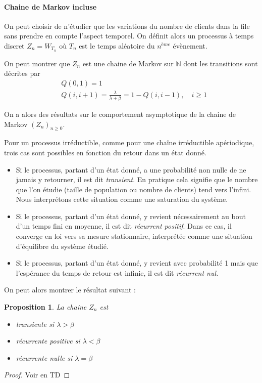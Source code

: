 \documentclass[a4paper,12pt]{book}
\newtheorem{propfr}[thmfr]{Proposition}
\newcommand{\N}{\mathbb{N}}
\begin{document}
\paragraph{Chaine de Markov incluse}
On peut choisir de n'étudier que les variations du nombre de clients dans la file sans prendre en compte l'aspect temporel. On définit alors un processus à temps discret $Z_n=W_{T_n}$ où $T_n$ est le temps aléatoire du $n^{ème}$ évènement.

On peut montrer que $Z_n$ est une chaine de Markov sur $\N$ dont les transitions sont décrites par
\begin{align*}
&Q(0,1)=1\\
&Q(i,i+1)=\frac{\lambda}{\lambda+\beta}=1-Q(i,i-1), \quad i\ge1
\end{align*}

On a alors des résultats sur le comportement asymptotique de la chaine de Markov $(Z_n)_{n\ge0}$.

Pour un processus irréductible, comme pour une chaîne irréductible apériodique, trois cas sont possibles en fonction du retour dans un état donné.
\begin{itemize}
\item Si le processus, partant d’un état donné, a une probabilité non nulle de
ne jamais y retourner, il est dit \textit{transient}. En pratique cela signifie que le
nombre que l’on étudie (taille de population ou nombre de clients) tend
vers l’infini. Nous interprétons cette situation comme une saturation du
système.
\item Si le processus, partant d’un état donné, y revient nécessairement au
bout d’un temps fini en moyenne, il est dit \textit{récurrent positif}. Dans ce
cas, il converge en loi vers sa mesure stationnaire, interprétée comme
une situation d’équilibre du système étudié.
\item Si le processus, partant d’un état donné, y revient avec probabilité 1
mais que l’espérance du temps de retour est infinie, il est dit \textit{récurrent
nul.} \end{itemize}

On peut alors montrer le résultat suivant :

\begin{propfr}
La chaine $Z_n$ est
\begin{itemize}
\item transiente si $\lambda>\beta$
\item récurrente positive si $\lambda<\beta$
\item récurrente nulle si $\lambda=\beta$
\end{itemize}
\end{propfr}
\begin{proof}
Voir en TD
\end{proof}
\end{document}

